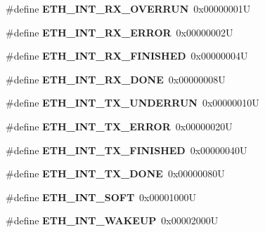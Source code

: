 \begin{DoxyCompactItemize}
\item 
\mbox{\label{lpc-ethernet_8c_af2f263e6815e5e58fa87236d90564d0a}} 
\#define {\bfseries E\+T\+H\+\_\+\+I\+N\+T\+\_\+\+R\+X\+\_\+\+O\+V\+E\+R\+R\+UN}~0x00000001U
\item 
\mbox{\label{lpc-ethernet_8c_a60c5b6001fce13882218e1270b527ed5}} 
\#define {\bfseries E\+T\+H\+\_\+\+I\+N\+T\+\_\+\+R\+X\+\_\+\+E\+R\+R\+OR}~0x00000002U
\item 
\mbox{\label{lpc-ethernet_8c_a48e775c699380ee94ddd9a7b6e832457}} 
\#define {\bfseries E\+T\+H\+\_\+\+I\+N\+T\+\_\+\+R\+X\+\_\+\+F\+I\+N\+I\+S\+H\+ED}~0x00000004U
\item 
\mbox{\label{lpc-ethernet_8c_ab6641100e85d9d3733d58aba1e5da543}} 
\#define {\bfseries E\+T\+H\+\_\+\+I\+N\+T\+\_\+\+R\+X\+\_\+\+D\+O\+NE}~0x00000008U
\item 
\mbox{\label{lpc-ethernet_8c_ae5852ab086c4edb00063c95dca84e264}} 
\#define {\bfseries E\+T\+H\+\_\+\+I\+N\+T\+\_\+\+T\+X\+\_\+\+U\+N\+D\+E\+R\+R\+UN}~0x00000010U
\item 
\mbox{\label{lpc-ethernet_8c_acf118d689f31aaca96b36f312fc136e5}} 
\#define {\bfseries E\+T\+H\+\_\+\+I\+N\+T\+\_\+\+T\+X\+\_\+\+E\+R\+R\+OR}~0x00000020U
\item 
\mbox{\label{lpc-ethernet_8c_a4d5d107071dc2e90cada6aba4e2eea85}} 
\#define {\bfseries E\+T\+H\+\_\+\+I\+N\+T\+\_\+\+T\+X\+\_\+\+F\+I\+N\+I\+S\+H\+ED}~0x00000040U
\item 
\mbox{\label{lpc-ethernet_8c_a96f37b7fe52acc0469fb6e8bf131c3fb}} 
\#define {\bfseries E\+T\+H\+\_\+\+I\+N\+T\+\_\+\+T\+X\+\_\+\+D\+O\+NE}~0x00000080U
\item 
\mbox{\label{lpc-ethernet_8c_a80ec60d40a74b1156747020f531f13bb}} 
\#define {\bfseries E\+T\+H\+\_\+\+I\+N\+T\+\_\+\+S\+O\+FT}~0x00001000U
\item 
\mbox{\label{lpc-ethernet_8c_af6e688ad09f2fde63c3f699c64fbeec4}} 
\#define {\bfseries E\+T\+H\+\_\+\+I\+N\+T\+\_\+\+W\+A\+K\+E\+UP}~0x00002000U

\end{DoxyCompactItemize}
